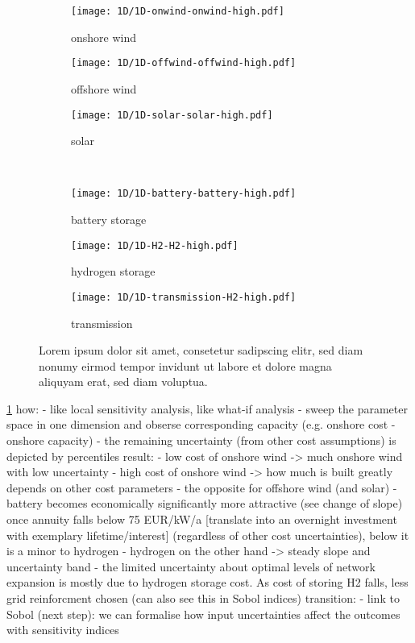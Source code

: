 \begin{figure}
    \begin{subfigure}[t]{0.32\textwidth}
        \caption{onshore wind}
        \texttt{[image: 1D/1D-onwind-onwind-high.pdf]}
    \end{subfigure}
    \begin{subfigure}[t]{0.32\textwidth}
        \caption{offshore wind}
        \texttt{[image: 1D/1D-offwind-offwind-high.pdf]}
    \end{subfigure}
    \begin{subfigure}[t]{0.32\textwidth}
        \caption{solar}
        \texttt{[image: 1D/1D-solar-solar-high.pdf]}
    \end{subfigure} \\
    \begin{subfigure}[t]{0.32\textwidth}
        \caption{battery storage}
        \texttt{[image: 1D/1D-battery-battery-high.pdf]}
    \end{subfigure}
    \begin{subfigure}[t]{0.32\textwidth}
        \caption{hydrogen storage}
        \texttt{[image: 1D/1D-H2-H2-high.pdf]}
    \end{subfigure}
    \begin{subfigure}[t]{0.32\textwidth}
        \caption{transmission}
        \texttt{[image: 1D/1D-transmission-H2-high.pdf]}
    \end{subfigure}
    \caption{Lorem ipsum dolor sit amet, consetetur sadipscing elitr, sed diam nonumy eirmod tempor invidunt ut labore et dolore magna aliquyam erat, sed diam voluptua.}
    \label{fig:sensitivity}
\end{figure}

\cref{fig:sensitivity}
how:
- like local sensitivity analysis, like what-if analysis
- sweep the parameter space in one dimension and obserse corresponding capacity (e.g. onshore cost - onshore capacity)
- the remaining uncertainty (from other cost assumptions) is depicted by percentiles
result:
- low cost of onshore wind -> much onshore wind with low uncertainty
- high cost of onshore wind -> how much is built greatly depends on other cost parameters
- the opposite for offshore wind (and solar)
- battery  becomes economically significantly more attractive (see change of slope) once annuity falls below 75 EUR/kW/a [translate into an overnight investment with exemplary lifetime/interest] (regardless of other cost uncertainties), below it is a minor to hydrogen
- hydrogen on the other hand -> steady slope and uncertainty band
- the limited uncertainty about optimal levels of network expansion is mostly due to hydrogen storage cost. As cost of storing H2 falls, less grid reinforcment chosen (can also see this  in Sobol indices)
transition:
- link to Sobol (next step): we can formalise how input uncertainties affect the outcomes with sensitivity indices

